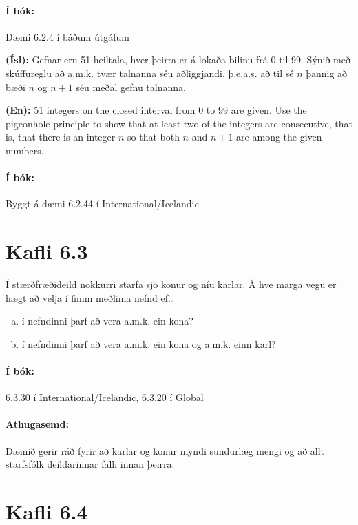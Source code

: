 \documentclass{article}
\begin{document}
\paragraph{Í bók:} Dæmi 6.2.4 í báðum útgáfum

\question 

\textbf{(Ísl):} Gefnar eru 51 heiltala, hver þeirra er á lokaða bilinu frá 0 til 99. Sýnið með skúffureglu að a.m.k. tvær talnanna séu aðliggjandi, þ.e.a.s. að til sé $n$ þannig að bæði $n$ og $n+1$ séu meðal gefnu talnanna.

\textbf{(En):} 51 integers on the closed interval from 0 to 99 are given. Use the pigeonhole principle to show that at least two of the integers are consecutive, that is, that there is an integer $n$ so that both $n$ and $n+1$ are among the given numbers.

\paragraph{Í bók:} Byggt á dæmi 6.2.44 í International/Icelandic

\section{Kafli 6.3}

\question

Í stærðfræðideild nokkurri starfa sjö konur og níu karlar. Á hve marga vegu er hægt að velja í fimm meðlima nefnd ef\ldots

\begin{enumerate}[a)]
    \item í nefndinni þarf að vera a.m.k. ein kona?
    \item í nefndinni þarf að vera a.m.k. ein kona og a.m.k. einn karl?
\end{enumerate}

\paragraph{Í bók:} 6.3.30 í International/Icelandic, 6.3.20 í Global

\paragraph{Athugasemd:} Dæmið gerir ráð fyrir að karlar og konur myndi sundurlæg mengi og að allt starfsfólk deildarinnar falli innan þeirra.

\section{Kafli 6.4}
\end{document}
